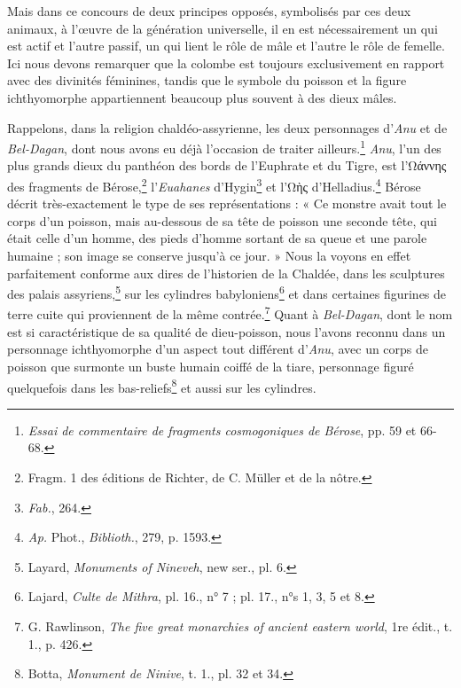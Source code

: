 \documentclass[a4paper, 11pt, oneside]{article}
\begin{document}
Mais dans ce concours de deux principes opposés, symbolisés par ces deux animaux, à l'œuvre de la génération universelle, il en est nécessairement un qui est actif et l'autre passif, un qui lient le rôle de mâle et l'autre le rôle de femelle. Ici nous devons remarquer que la colombe est toujours exclusivement en rapport avec des divinités féminines, tandis que le symbole du poisson et la figure ichthyomorphe appartiennent beaucoup plus souvent à des dieux mâles.

Rappelons, dans la religion chaldéo-assyrienne, les deux personnages d'\emph{Anu} et de \emph{Bel-Dagan}, dont nous avons eu déjà l'occasion de traiter ailleurs.\footnote{\emph{Essai de commentaire de fragments cosmogoniques de Bérose}, pp. 59 et 66-68.} \emph{Anu}, l'un des plus grands dieux du panthéon des bords de l'Euphrate et du Tigre, est l'Ωάννης des fragments de Bérose,\footnote{Fragm. 1 des éditions de Richter, de C. Müller et de la nôtre.} l'\emph{Euahanes} d'Hygin\footnote{\emph{Fab.}, 264.} et l'Ωὴς d'Helladius.\footnote{\emph{Ap.} Phot., \emph{Biblioth.}, 279, p. 1593.} Bérose décrit très-exactement le type de ses représentations : « Ce monstre avait tout le corps d'un poisson, mais au-dessous de sa tête de poisson une seconde tête, qui était celle d'un homme, des pieds d'homme sortant de sa queue et une parole humaine ; son image se conserve jusqu'à ce jour. » Nous la voyons en effet parfaitement conforme aux dires de l'historien de la Chaldée, dans les sculptures des palais assyriens,\footnote{Layard, \emph{Monuments of Nineveh}, new ser., pl. 6.} sur les cylindres babyloniens\footnote{Lajard, \emph{Culte de Mithra}, pl. 16., n° 7 ; pl. 17., n°s 1, 3, 5 et 8.} et dans certaines figurines de terre cuite qui proviennent de la même contrée.\footnote{G. Rawlinson, \emph{The five great monarchies of ancient eastern world}, 1re édit., t. 1., p. 426.} Quant à \emph{Bel-Dagan}, dont le nom est si caractéristique de sa qualité de dieu-poisson, nous l'avons reconnu dans un personnage ichthyomorphe d'un aspect tout différent d'\emph{Anu}, avec un corps de poisson que surmonte un buste humain coiffé de la tiare, personnage figuré quelquefois dans les bas-reliefs\footnote{Botta, \emph{Monument de Ninive}, t. 1., pl. 32 et 34.} et aussi sur les cylindres.
\end{document}
